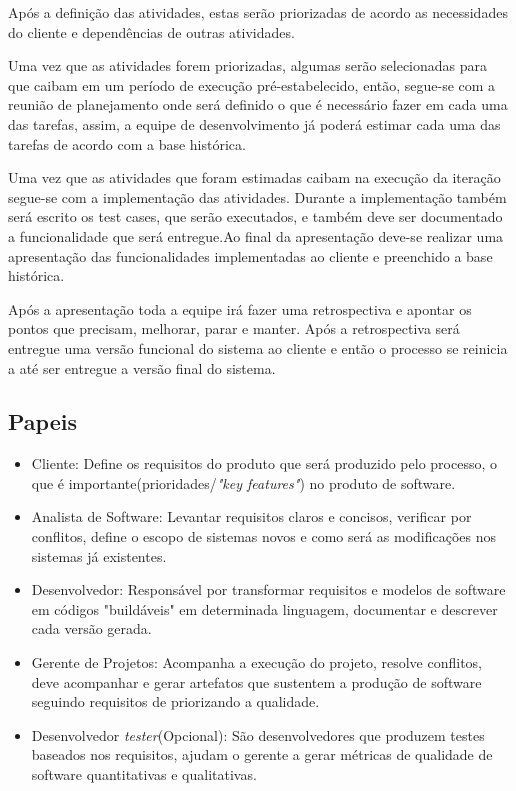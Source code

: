 \documentclass[	DIV=calc,%
							paper=a4,%
							fontsize=12pt,%
							onecolumn]{scrartcl}	 					%
\begin{document}
Após a definição das atividades, estas serão priorizadas de acordo as necessidades do cliente e dependências de outras atividades. 

Uma vez que as atividades forem priorizadas, algumas serão selecionadas para que caibam em um período de execução pré-estabelecido, então, segue-se com a reunião de planejamento onde será definido o que é necessário fazer em cada uma das tarefas, assim, a equipe de desenvolvimento já poderá estimar cada uma das tarefas de acordo com a base histórica.

Uma vez que as atividades que foram estimadas caibam na execução da iteração segue-se com a implementação das atividades. Durante a implementação também será escrito os test cases, que serão executados, e também deve ser documentado a funcionalidade que será entregue.Ao final da apresentação deve-se realizar uma apresentação das funcionalidades implementadas ao cliente e preenchido a base histórica. 

Após a apresentação toda a equipe irá fazer uma retrospectiva e apontar os pontos que precisam, melhorar, parar e manter. Após a retrospectiva será entregue uma versão funcional do sistema ao cliente e então o processo se reinicia a até ser entregue a versão final do sistema.


\subsection{Papeis}
\begin{itemize}
	\item Cliente: Define os requisitos do produto que será produzido pelo processo, o que é importante(prioridades/\textit{"key features"}) no produto de software.
	\item Analista de Software: Levantar requisitos claros e concisos, verificar por conflitos, define o  escopo de sistemas novos e como será as modificações nos sistemas já existentes.
	\item Desenvolvedor: Responsável por transformar requisitos e modelos de software em códigos "buildáveis" em determinada linguagem, documentar e descrever cada versão gerada.
	\item Gerente de Projetos: Acompanha a execução do projeto, resolve conflitos, deve acompanhar e gerar artefatos que sustentem a produção de software seguindo requisitos de priorizando a qualidade.
	\item Desenvolvedor \textit{tester}(Opcional): São desenvolvedores que produzem testes baseados nos requisitos, ajudam o gerente a gerar métricas de qualidade de software quantitativas e qualitativas.   
\end{itemize}
\end{document}
